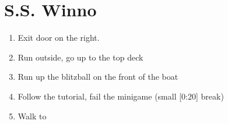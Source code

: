 \chapter{S.S. Winno}
\begin{enumerate}
    \item Exit door on the right.
    \item Run outside, go up to the top deck
    \item Run up the blitzball on the front of the boat
    \item Follow the tutorial, fail the minigame (small [0:20] break)
    \item Walk to \yuna
\end{enumerate}
